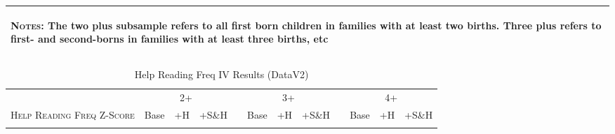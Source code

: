 \begin{landscape}
\begin{table}[htpb!]
\begin{center}
\begin{tabular}{lcccp{2mm}cccp{2mm}ccc}
\midrule\multicolumn{12}{p{19.2cm}}{\begin{footnotesize}\textsc{Notes:} The two plus subsample refers to all first born children in families with at least two births.  Three plus refers to first- and second-borns in families with at least three births, etc\end{footnotesize}} \\ \bottomrule 
\end{tabular}\end{center}\end{table}\end{landscape}\begin{landscape}\begin{table}[htpb!]\caption{Help Reading Freq IV Results (DataV2)}
\label{TWINtab:IVAll}
\begin{center}\begin{tabular}{lcccp{2mm}cccp{2mm}ccc}
\toprule \toprule 
&\multicolumn{3}{c}{2+}&&\multicolumn{3}{c}{3+}&&\multicolumn{3}{c}{4+}\\ \cmidrule(r){2-4} \cmidrule(r){6-8} \cmidrule(r){10-12} 
\textsc{Help Reading Freq Z-Score}&Base&+H&+S\&H&&Base&+H&+S\&H&&Base&+H&+S\&H\\ \midrule 
\begin{footnotesize}\end{footnotesize}& 
\begin{footnotesize}\end{footnotesize}& 
\begin{footnotesize}\end{footnotesize}& 
\begin{footnotesize}\end{footnotesize}& 
\begin{footnotesize}\end{footnotesize}& 
\begin{footnotesize}\end{footnotesize}& 
\begin{footnotesize}\end{footnotesize}& 
\begin{footnotesize}\end{footnotesize}& 
\begin{footnotesize}\end{footnotesize}& 
\begin{footnotesize}\end{footnotesize}& 
\begin{footnotesize}\end{footnotesize}& 
\begin{footnotesize}\end{footnotesize}\\ 

\end{tabular}
\end{center}
\end{table}
\end{landscape}
